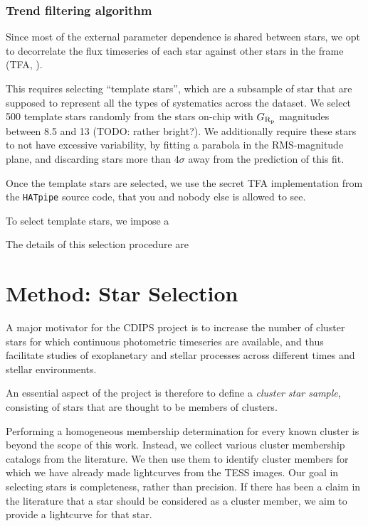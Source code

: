 \documentclass[12pt,twocolumn,tighten]{aastex62}
\begin{document}
\subsubsection{Trend filtering algorithm}
\label{sec:tfa_is_good_enough}


Since most of the external parameter dependence is shared between
stars, we opt to decorrelate the flux timeseries of each star
against other stars in the frame (TFA, \citealt{kovacs_trend_2005}).


This requires selecting ``template stars'', which are a subsample of
star that are supposed to represent all the types of systematics
across the dataset. 
We select 500 template stars randomly from the stars on-chip with
$G_{\rm R_p}$ magnitudes between 8.5 and 13 (TODO: rather bright?).
We additionally require these stars to not have excessive variability,
by fitting a parabola in the RMS-magnitude plane, and discarding stars
more than $4\sigma$ away from the prediction of this fit.

Once the template stars are selected, we use the secret TFA
implementation from the \texttt{HATpipe} source code, that you and
nobody else is allowed to see.

To select template stars, we impose a 

The details of this selection procedure are 

\section{Method: Star Selection}
\label{sec:starselection}

A major motivator for the CDIPS project is to increase the number of
cluster stars for which continuous photometric timeseries are
available, and thus facilitate studies of exoplanetary and stellar
processes across different times and stellar environments.

An essential aspect of the project is therefore to define a {\it
cluster star sample}, consisting of stars that are thought to be
members of clusters.

Performing a homogeneous membership determination for every known
cluster is beyond the scope of this work.  Instead, we collect various
cluster membership catalogs from the literature.  We then use them to
identify cluster members for which we have already made lightcurves
from the TESS images.  Our goal in selecting stars is completeness,
rather than precision.  If there has been a claim in the literature
that a star should be considered as a cluster member, we aim to
provide a lightcurve for that star.
\end{document}
